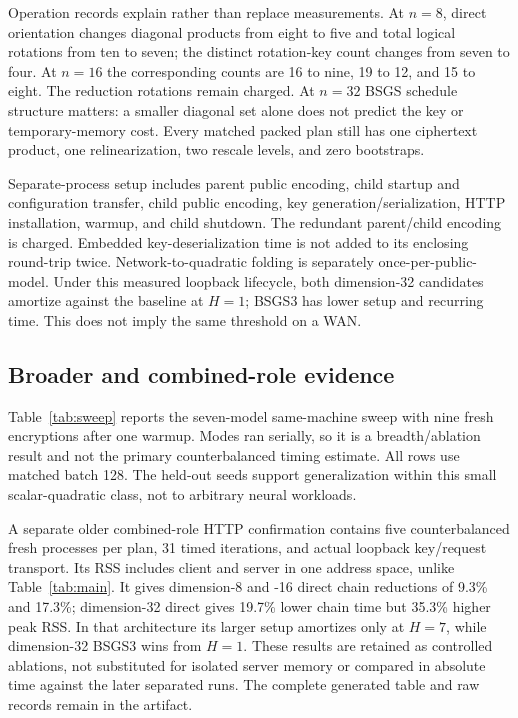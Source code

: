 \documentclass[10pt]{article}
\begin{document}
Operation records explain rather than replace measurements. At $n=8$, direct orientation changes diagonal products from eight to five and total logical rotations from ten to seven; the distinct rotation-key count changes from seven to four. At $n=16$ the corresponding counts are 16 to nine, 19 to 12, and 15 to eight. The reduction rotations remain charged. At $n=32$ BSGS schedule structure matters: a smaller diagonal set alone does not predict the key or temporary-memory cost. Every matched packed plan still has one ciphertext product, one relinearization, two rescale levels, and zero bootstraps.

Separate-process setup includes parent public encoding, child startup and configuration transfer, child public encoding, key generation/serialization, HTTP installation, warmup, and child shutdown. The redundant parent/child encoding is charged. Embedded key-deserialization time is not added to its enclosing round-trip twice. Network-to-quadratic folding is separately once-per-public-model. Under this measured loopback lifecycle, both dimension-32 candidates amortize against the baseline at $H=1$; BSGS3 has lower setup and recurring time. This does not imply the same threshold on a WAN.

\subsection{Broader and combined-role evidence}\label{sec:secondary}
Table~\ref{tab:sweep} reports the seven-model same-machine sweep with nine fresh encryptions after one warmup. Modes ran serially, so it is a breadth/ablation result and not the primary counterbalanced timing estimate. All rows use matched batch 128. The held-out seeds support generalization within this small scalar-quadratic class, not to arbitrary neural workloads.
\begin{table}[t]\centering\scriptsize
\resizebox{\linewidth}{!}{}
\caption{Broad matched-batch portfolio: fastest tested baseline per frozen model. These are combined-role measurements and must not be mixed with Table~\ref{tab:main}.}\label{tab:sweep}
\end{table}

A separate older combined-role HTTP confirmation contains five counterbalanced fresh processes per plan, 31 timed iterations, and actual loopback key/request transport. Its RSS includes client and server in one address space, unlike Table~\ref{tab:main}. It gives dimension-8 and -16 direct chain reductions of 9.3\% and 17.3\%; dimension-32 direct gives 19.7\% lower chain time but 35.3\% higher peak RSS. In that architecture its larger setup amortizes only at $H=7$, while dimension-32 BSGS3 wins from $H=1$. These results are retained as controlled ablations, not substituted for isolated server memory or compared in absolute time against the later separated runs. The complete generated table and raw records remain in the artifact.
\end{document}
